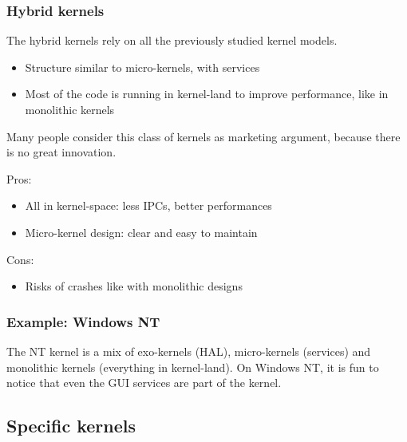 %
%

\begin{frame}
  \frametitle{Hybrid kernels}

  The hybrid kernels rely on all the previously studied kernel models.

  \begin{itemize}
  \item
    Structure similar to micro-kernels, with services
  \item
    Most of the code is running in kernel-land to improve performance, like in monolithic kernels
  \end{itemize}

  Many people consider this class of kernels as marketing argument, because there is no great innovation.

  \-

  Pros:

  \begin{itemize}
  \item
    All in kernel-space: less IPCs, better performances
  \item
    Micro-kernel design: clear and easy to maintain
  \end{itemize}

  \-

  Cons:

  \begin{itemize}
  \item
    Risks of crashes like with monolithic designs
  \end{itemize}

\end{frame}

%
%

\begin{frame}
  \frametitle{Example: Windows NT}

  \begin{center}
  \end{center}

  The NT kernel is a mix of exo-kernels (HAL), micro-kernels (services) and monolithic kernels (everything in kernel-land). On Windows NT, it is fun to notice that even the GUI services are part of the kernel.

\end{frame}

%
%

\subsection{Specific kernels}

